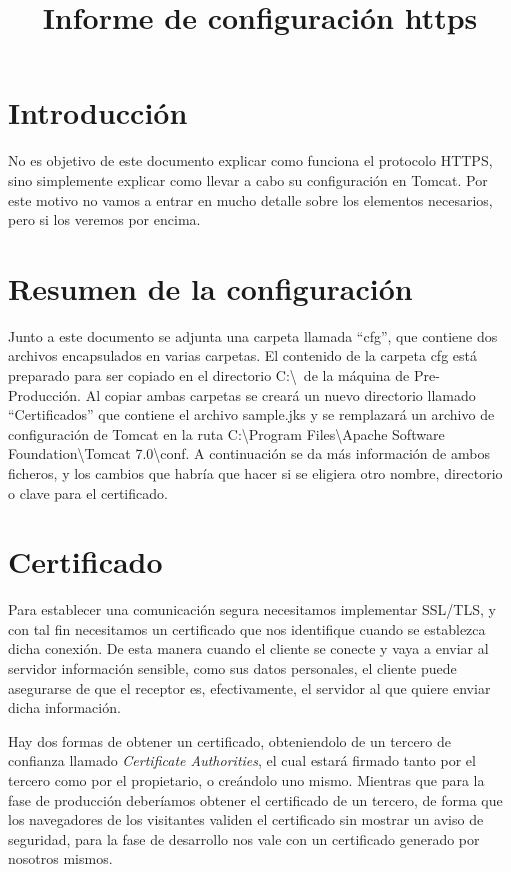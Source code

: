 \documentclass[a4paper]{article}
\title{Informe de configuración https}
\date{}
\begin{document}
\setlength{\voffset}{-5em}
\maketitle

\section{Introducción}

No es objetivo de este documento explicar como funciona el protocolo HTTPS, sino simplemente explicar como llevar a cabo su configuración en Tomcat. Por este motivo no vamos a entrar en mucho detalle sobre los elementos necesarios, pero si los veremos por encima.

\section{Resumen de la configuración}

Junto a este documento se adjunta una carpeta llamada ``cfg'', que contiene dos archivos encapsulados en varias carpetas. El contenido de la carpeta cfg está preparado para ser copiado en el directorio C:\textbackslash \ de la máquina de Pre-Producción. Al copiar ambas carpetas se creará un nuevo directorio llamado ``Certificados'' que contiene el archivo sample.jks y se remplazará un archivo de configuración de Tomcat en la ruta C:\textbackslash Program Files\textbackslash Apache Software Foundation\textbackslash Tomcat 7.0\textbackslash conf. A continuación se da más información de ambos ficheros, y los cambios que habría que hacer si se eligiera otro nombre, directorio o clave para el certificado.

\section{Certificado}

Para establecer una comunicación segura necesitamos implementar SSL/TLS, y con tal fin necesitamos un certificado que nos identifique cuando se establezca dicha conexión. De esta manera cuando el cliente se conecte y vaya a enviar al servidor información sensible, como sus datos personales, el cliente puede asegurarse de que el receptor es, efectivamente, el servidor al que quiere enviar dicha información.

Hay dos formas de obtener un certificado, obteniendolo de un tercero de confianza llamado \textit{Certificate Authorities}, el cual estará firmado tanto por el tercero como por el propietario, o creándolo uno mismo. Mientras que para la fase de producción deberíamos obtener el certificado de un tercero, de forma que los navegadores de los visitantes validen el certificado sin mostrar un aviso de seguridad, para la fase de desarrollo nos vale con un certificado generado por nosotros mismos.
\end{document}
